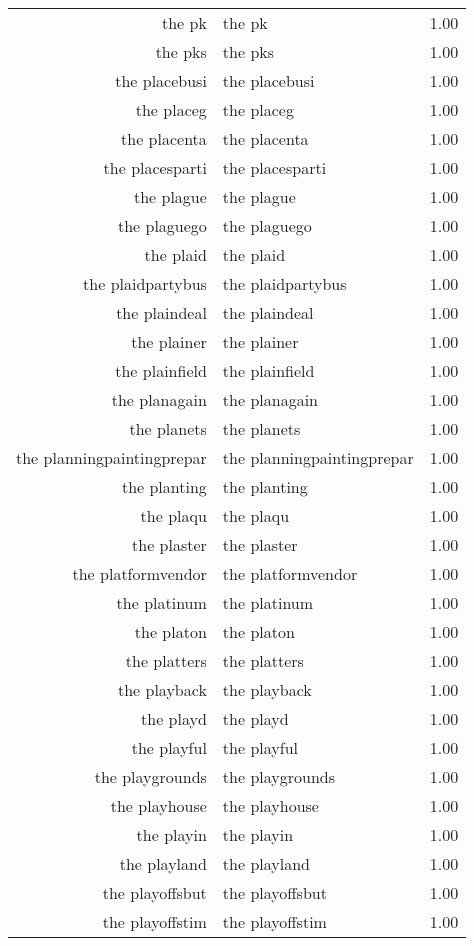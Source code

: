 \begin{table}[ht]
\begin{tabular}{rlr}
  the pk & the pk & 1.00 \\ 
  the pks & the pks & 1.00 \\ 
  the placebusi & the placebusi & 1.00 \\ 
  the placeg & the placeg & 1.00 \\ 
  the placenta & the placenta & 1.00 \\ 
  the placesparti & the placesparti & 1.00 \\ 
  the plague & the plague & 1.00 \\ 
  the plaguego & the plaguego & 1.00 \\ 
  the plaid & the plaid & 1.00 \\ 
  the plaidpartybus & the plaidpartybus & 1.00 \\ 
  the plaindeal & the plaindeal & 1.00 \\ 
  the plainer & the plainer & 1.00 \\ 
  the plainfield & the plainfield & 1.00 \\ 
  the planagain & the planagain & 1.00 \\ 
  the planets & the planets & 1.00 \\ 
  the planningpaintingprepar & the planningpaintingprepar & 1.00 \\ 
  the planting & the planting & 1.00 \\ 
  the plaqu & the plaqu & 1.00 \\ 
  the plaster & the plaster & 1.00 \\ 
  the platformvendor & the platformvendor & 1.00 \\ 
  the platinum & the platinum & 1.00 \\ 
  the platon & the platon & 1.00 \\ 
  the platters & the platters & 1.00 \\ 
  the playback & the playback & 1.00 \\ 
  the playd & the playd & 1.00 \\ 
  the playful & the playful & 1.00 \\ 
  the playgrounds & the playgrounds & 1.00 \\ 
  the playhouse & the playhouse & 1.00 \\ 
  the playin & the playin & 1.00 \\ 
  the playland & the playland & 1.00 \\ 
  the playoffsbut & the playoffsbut & 1.00 \\ 
  the playoffstim & the playoffstim & 1.00 \\ 

\end{tabular}
\end{table}

